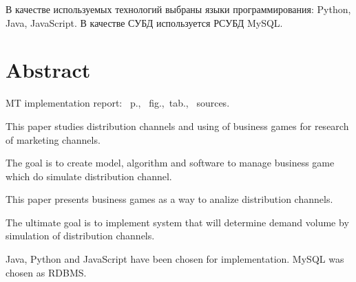 В качестве используемых технологий выбраны языки программирования: Python, Java, JavaScript. В качестве СУБД используется РСУБД MySQL.

\section*{Abstract}
\skipline
MT implementation report:
~p., ~fig.,~tab.,
~sources.\skipline

\skipline

This paper studies distribution channels and using of business games for research of marketing channels.

The goal is to create model, algorithm and software to manage business game which do simulate distribution channel.

This paper presents business games as a way to analize distribution channels.

The ultimate goal is to implement system that will determine demand volume by simulation of distribution channels.

Java, Python and JavaScript have been chosen for implementation. MySQL was chosen as RDBMS.
